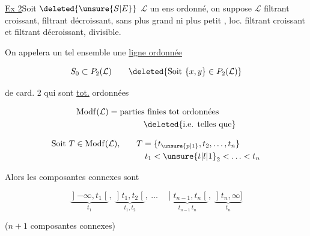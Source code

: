 
\uline{Ex 2}\quad Soit $\deleted{\unsure{S|E}}$ $\mathcal L$ un ens ordonné,
on suppose $\mathcal L$ filtrant croissant, filtrant
décroissant, sans plus grand ni
plus petit , loc. filtrant croissant
et filtrant décroissant, divisible.

On appelera un tel ensemble une
\uline{ligne ordonnée}

\[
S_0\subset P_2(\mathcal L)\qquad
\deleted{\text{Soit }\{x,y\}\in P_2(\mathcal L)}
\]

\textquotedbl\quad {}  de card. 2  qui sont \uline{tot.} ordonnées

\[
\begin{aligned}
&\mathrm{Modf}(\mathcal L)=\text{parties finies tot ordonnées}\\
&\hspace{8em}\deleted{\text{i.e. telles que}}
\end{aligned}
\]

\[
\begin{aligned}
 \text{Soit }T\in\mathrm{Modf}(\mathcal L),\qquad &T=\{t_{\unsure{p|1}},t_2,\ldots,t_{n}\}\\
 &\quad t_1<\unsure{t|l|1}_2<\ldots<t_n
\end{aligned}
\]

Alors les composantes connexes sont

\[
\underbrace{\mathopen{]}-\infty,t_1\mathclose{[}}_{t_1},\
\underbrace{\mathopen{]}t_1,t_2\mathclose{[}}_{t_1,t_2},\
\ldots\quad
\underbrace{\mathopen{]}t_{n-1},t_n\mathclose{[}}_{t_{n-1}\,t_n},\
\underbrace{\mathopen{]}t_n,\infty\mathclose{]}}_{t_n}
\]


($n+1$ composantes connexes)

